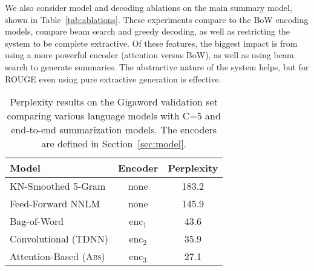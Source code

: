 \documentclass[11pt,a4paper]{article}
\begin{document}
We also consider model and decoding ablations on the main summary
model, shown in Table~\ref{tab:ablations}. These experiments
compare to the BoW encoding models, compare beam search and greedy
decoding, as well as restricting the system to be complete
extractive. Of these features, the biggest impact is from using a more
powerful encoder (attention versus BoW), as well as using beam search
to generate summaries. The abstractive nature of the system helps, but
for ROUGE even using pure extractive generation is effective.




\begin{table}
  \centering
  \small
  \begin{tabular}{lcc}
    \toprule
    Model & Encoder & Perplexity  \\
    \midrule
    KN-Smoothed 5-Gram  & none   & 183.2  \\
    Feed-Forward NNLM & none    & 145.9  \\
    Bag-of-Word   & enc$_1$  & 43.6   \\
    Convolutional (TDNN)  & enc$_2$  & 35.9  \\
    Attention-Based (\textsc{Abs})  & enc$_3$  & 27.1 \\
    \bottomrule
  \end{tabular}
  \caption{\small \label{tab:perp} Perplexity results on the Gigaword validation set comparing various language models with C=5 and end-to-end summarization models. The encoders are defined in Section~\ref{sec:model}.
  }
\end{table}
\end{document}
